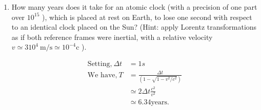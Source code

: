 \begin{enumerate}[ label=\color{ocre}\textbf{\arabic*.}]
\item How many years does it take for an atomic clock (with a precision of one part over $10^{15}$ ), which is placed at rest on Earth, to lose one second with respect to an identical clock placed on the Sun? (Hint: apply Lorentz transformations as if both reference frames were inertial, with a relative velocity $v \simeq 310^{4} \mathrm{~m} / \mathrm{s} \simeq 10^{-4} \mathrm{c}$ ).
\begin{answer}
	\begin{align*}
	\text{Setting,}\ \Delta t&=1s\\ \text{We have,}\ T&=\frac{\Delta t}{\left(1-\sqrt{1-v^{2} / c^{2}}\right)} \\& \simeq 2 \Delta t \frac{c^{2}}{v^{2}}\\& \simeq 6.34 \text{years.}
	\end{align*}
\end{answer}
\end{enumerate}



